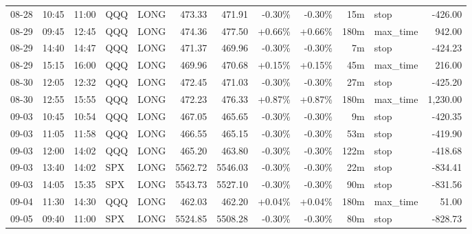 \documentclass[11pt,a4paper]{article}
\begin{document}
\begin{center}
\begin{longtable}{>{\color{txtmain}}l l l l l r r r r r >{\color{txtmain}}l r}
08-28 & 10:45 & 11:00 & QQQ & LONG & 473.33 & 471.91 & \textcolor{lossred}{-0.30\%} & \textcolor{lossred}{-0.30\%} & 15m & stop & \textcolor{lossred}{-426.00} \\
08-29 & 09:45 & 12:45 & QQQ & LONG & 474.36 & 477.50 & \textcolor{wingreen}{+0.66\%} & \textcolor{wingreen}{+0.66\%} & 180m & max\_time & \textcolor{wingreen}{942.00} \\
08-29 & 14:40 & 14:47 & QQQ & LONG & 471.37 & 469.96 & \textcolor{lossred}{-0.30\%} & \textcolor{lossred}{-0.30\%} & 7m & stop & \textcolor{lossred}{-424.23} \\
08-29 & 15:15 & 16:00 & QQQ & LONG & 469.96 & 470.68 & \textcolor{wingreen}{+0.15\%} & \textcolor{wingreen}{+0.15\%} & 45m & max\_time & \textcolor{wingreen}{216.00} \\
08-30 & 12:05 & 12:32 & QQQ & LONG & 472.45 & 471.03 & \textcolor{lossred}{-0.30\%} & \textcolor{lossred}{-0.30\%} & 27m & stop & \textcolor{lossred}{-425.20} \\
08-30 & 12:55 & 15:55 & QQQ & LONG & 472.23 & 476.33 & \textcolor{wingreen}{+0.87\%} & \textcolor{wingreen}{+0.87\%} & 180m & max\_time & \textcolor{wingreen}{1,230.00} \\
09-03 & 10:45 & 10:54 & QQQ & LONG & 467.05 & 465.65 & \textcolor{lossred}{-0.30\%} & \textcolor{lossred}{-0.30\%} & 9m & stop & \textcolor{lossred}{-420.35} \\
09-03 & 11:05 & 11:58 & QQQ & LONG & 466.55 & 465.15 & \textcolor{lossred}{-0.30\%} & \textcolor{lossred}{-0.30\%} & 53m & stop & \textcolor{lossred}{-419.90} \\
09-03 & 12:00 & 14:02 & QQQ & LONG & 465.20 & 463.80 & \textcolor{lossred}{-0.30\%} & \textcolor{lossred}{-0.30\%} & 122m & stop & \textcolor{lossred}{-418.68} \\
09-03 & 13:40 & 14:02 & SPX & LONG & 5562.72 & 5546.03 & \textcolor{lossred}{-0.30\%} & \textcolor{lossred}{-0.30\%} & 22m & stop & \textcolor{lossred}{-834.41} \\
09-03 & 14:05 & 15:35 & SPX & LONG & 5543.73 & 5527.10 & \textcolor{lossred}{-0.30\%} & \textcolor{lossred}{-0.30\%} & 90m & stop & \textcolor{lossred}{-831.56} \\
09-04 & 11:30 & 14:30 & QQQ & LONG & 462.03 & 462.20 & \textcolor{wingreen}{+0.04\%} & \textcolor{wingreen}{+0.04\%} & 180m & max\_time & \textcolor{wingreen}{51.00} \\
09-05 & 09:40 & 11:00 & SPX & LONG & 5524.85 & 5508.28 & \textcolor{lossred}{-0.30\%} & \textcolor{lossred}{-0.30\%} & 80m & stop & \textcolor{lossred}{-828.73} \\

\end{longtable}
\end{center}
\end{document}
